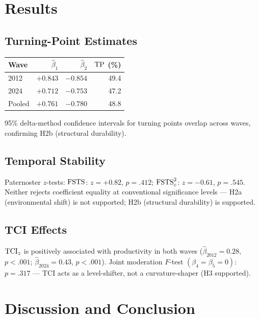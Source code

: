 \documentclass[12pt,a4paper]{article}
\begin{document}
\section{Results}
\label{sec:results}

\subsection{Turning-Point Estimates}

\begin{center}
\begin{tabular}{lrrr}
  \toprule
  Wave & \(\hat{\beta}_1\) & \(\hat{\beta}_2\) & \(\mathrm{TP}\) (\%) \\
  \midrule
  2012  & \(+0.843\) & \(-0.854\) & 49.4 \\
  2024  & \(+0.712\) & \(-0.753\) & 47.2 \\
  Pooled & \(+0.761\) & \(-0.780\) & 48.8 \\
  \bottomrule
\end{tabular}
\end{center}

95\% delta-method confidence intervals for turning points overlap across
waves, confirming H2b (structural durability).

\subsection{Temporal Stability}

Paternoster \(z\)-tests:
\({\mathrm{FSTS}}\): \(z = +0.82\), \(p = .412\);
\({\mathrm{FSTS}_{c}^{2}}\): \(z = -0.61\), \(p = .545\).
Neither rejects coefficient equality at conventional significance levels ---
H2a (environmental shift) is not supported; H2b (structural durability)
is supported.

\subsection{TCI Effects}

\({\mathrm{TCI}_{z}}\) is positively associated with productivity in both waves
(\(\hat{\beta}_{2012} = 0.28\), \(p < .001\);
\(\hat{\beta}_{2024} = 0.43\), \(p < .001\)).
Joint moderation \(F\)-test \((\beta_4 = \beta_5 = 0)\): \(p = .317\)
--- TCI acts as a level-shifter, not a curvature-shaper (H3 supported).

\section{Discussion and Conclusion}
\label{sec:discussion}
\end{document}
